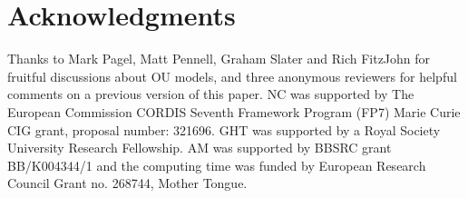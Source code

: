 \documentclass[a4paper,12pt]{article}
\begin{document}
\section{Acknowledgments}
Thanks to Mark Pagel, Matt Pennell, Graham Slater and Rich FitzJohn for fruitful discussions about OU models, and three anonymous reviewers for helpful comments on a previous version of this paper. NC was supported by The European Commission CORDIS Seventh Framework Program (FP7) Marie Curie CIG grant, proposal number: 321696. GHT was supported by a Royal Society University Research Fellowship. AM was supported by BBSRC grant BB/K004344/1 and the computing time was funded by European Research Council Grant no. 268744, Mother Tongue.



\end{document}
